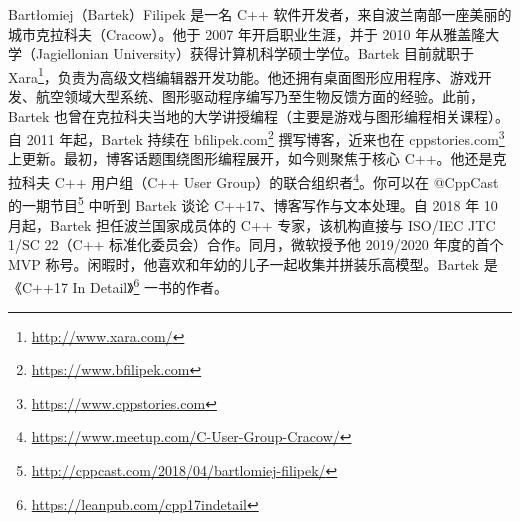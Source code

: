 Bartłomiej（Bartek）Filipek 是一名 C++ 软件开发者，来自波兰南部一座美丽的城市克拉科夫（Cracow）。他于 2007 年开启职业生涯，并于 2010 年从雅盖隆大学（Jagiellonian University）获得计算机科学硕士学位。Bartek 目前就职于 Xara\footnote{\url{http://www.xara.com/}}，负责为高级文档编辑器开发功能。他还拥有桌面图形应用程序、游戏开发、航空领域大型系统、图形驱动程序编写乃至生物反馈方面的经验。此前，Bartek 也曾在克拉科夫当地的大学讲授编程（主要是游戏与图形编程相关课程）。自 2011 年起，Bartek 持续在 bfilipek.com\footnote{\url{https://www.bfilipek.com}} 撰写博客，近来也在 cppstories.com\footnote{\url{https://www.cppstories.com}} 上更新。最初，博客话题围绕图形编程展开，如今则聚焦于核心 C++。他还是克拉科夫 C++ 用户组（C++ User Group）的联合组织者\footnote{\url{https://www.meetup.com/C-User-Group-Cracow/}}。你可以在 @CppCast 的一期节目\footnote{\url{http://cppcast.com/2018/04/bartlomiej-filipek/}} 中听到 Bartek 谈论 C++17、博客写作与文本处理。自 2018 年 10 月起，Bartek 担任波兰国家成员体的 C++ 专家，该机构直接与 ISO/IEC JTC 1/SC 22（C++ 标准化委员会）合作。同月，微软授予他 2019/2020 年度的首个 MVP 称号。闲暇时，他喜欢和年幼的儿子一起收集并拼装乐高模型。Bartek 是《C++17 In Detail》\footnote{\url{https://leanpub.com/cpp17indetail}} 一书的作者。
